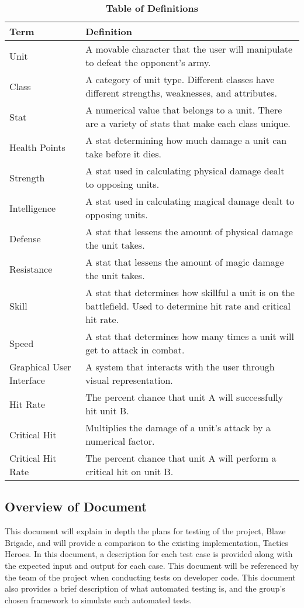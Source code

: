 \documentclass{article}
\begin{document}
\begin{table}[H]
\caption{\textbf{Table of Definitions}}
\begin{tabularx}{\textwidth}{lX}
    \toprule
    \textbf{Term} & \textbf{Definition} \\
    \midrule
    Unit & A movable character that the user will manipulate to defeat the opponent's army. \\
    Class & A category of unit type. Different classes have different strengths, weaknesses, and attributes. \\
    Stat & A numerical value that belongs to a unit. There are a variety of stats that make each class unique. \\
    Health Points & A stat determining how much damage a unit can take before it dies. \\
    Strength &  A stat used in calculating physical damage dealt to opposing units. \\
    Intelligence & A stat used in calculating magical damage dealt to opposing units. \\
    Defense & A stat that lessens the amount of physical damage the unit takes. \\
    Resistance & A stat that lessens the amount of magic damage the unit takes. \\
    Skill & A stat that determines how skillful a unit is on the battlefield. Used to determine hit rate and critical hit rate. \\
    Speed & A stat that determines how many times a unit will get to attack in combat. \\
    Graphical User Interface & A system that interacts with the user through visual representation. \\
    Hit Rate & The percent chance that unit A will successfully hit unit B. \\
    Critical Hit & Multiplies the damage of a unit's attack by a numerical factor. \\
    Critical Hit Rate & The percent chance that unit A will perform a critical hit on unit B. \\
    \bottomrule
\end{tabularx}
\end{table}

\subsection{Overview of Document}

This document will explain in depth the plans for testing of the project, Blaze Brigade, and will provide a comparison to the existing implementation, Tactics Heroes. In this document, a description for each test case is provided along with the expected input and output for each case. This document will be referenced by the team of the project when conducting tests on developer code. This document also provides a brief description of what automated testing is, and the group's chosen framework to simulate such automated tests.
\newpage
\end{document}
